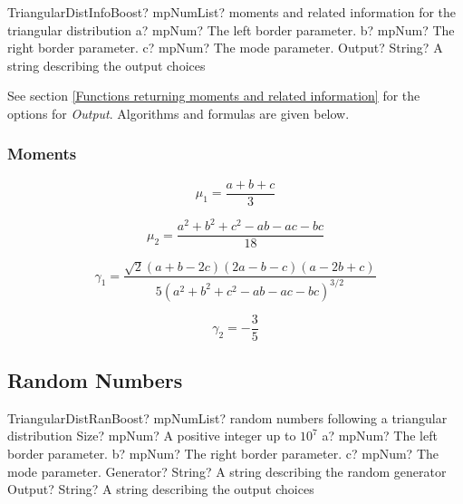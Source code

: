 \begin{mpFunctionsExtract}
	\mpFunctionFourNotImplemented
	{TriangularDistInfoBoost? mpNumList? moments and related information for the triangular distribution}
	{a? mpNum? The left border parameter.}
	{b? mpNum? The right border parameter.}
	{c? mpNum? The mode parameter.}
	{Output? String? A string describing the output choices}
\end{mpFunctionsExtract}

\vspace{0.3cm}

See section \ref{Functions returning moments and related information} for the options for {\itshape\sffamily Output}. Algorithms and formulas are given below.

\subsubsection{Moments}

\begin{equation} 
	\mu_1 = \frac{a+b+c}{3}
\end{equation}

\begin{equation} 
	\mu_2 = \frac{a^2+b^2+c^2-ab-ac-bc}{18}
\end{equation}

\begin{equation} 
	\gamma_1 = \frac{\sqrt{2}(a+b-2c)(2a-b-c)(a-2b+c)}{5(a^2+b^2+c^2-ab-ac-bc)^{3/2}}
\end{equation}

\begin{equation} 
	\gamma_2 = -\frac{3}{5}
\end{equation}




\subsection{Random Numbers}

\begin{mpFunctionsExtract}
	\mpFunctionSixNotImplemented
	{TriangularDistRanBoost? mpNumList? random numbers following a triangular distribution}
	{Size? mpNum? A positive integer up to $10^7$}
	{a? mpNum? The left border parameter.}
	{b? mpNum? The right border parameter.}
	{c? mpNum? The mode parameter.}
	{Generator? String? A string describing the random generator}
	{Output? String? A string describing the output choices}
\end{mpFunctionsExtract}

